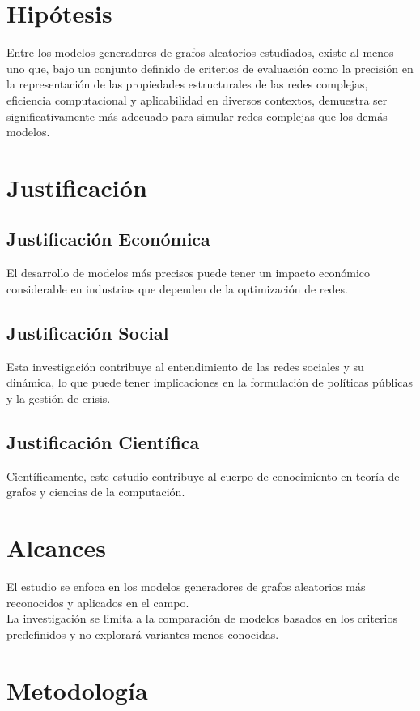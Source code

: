 \documentclass[12pt]{book}
\begin{document}
\section{Hipótesis}
Entre los modelos generadores de grafos aleatorios estudiados, existe al menos uno que, bajo un conjunto definido de criterios de evaluación como la precisión en la representación de las propiedades estructurales de las redes complejas, eficiencia computacional y aplicabilidad en diversos contextos, demuestra ser significativamente más adecuado para simular redes complejas que los demás modelos.

\section{Justificación}
\subsection{Justificación Económica}
El desarrollo de modelos más precisos puede tener un impacto económico considerable en industrias que dependen de la optimización de redes.
\subsection{Justificación Social}
Esta investigación contribuye al entendimiento de las redes sociales y su dinámica, lo que puede tener implicaciones en la formulación de políticas públicas y la gestión de crisis.
\subsection{Justificación Científica}
Científicamente, este estudio contribuye al cuerpo de conocimiento en teoría de grafos y ciencias de la computación.

\section{Alcances}
El estudio se enfoca en los modelos generadores de grafos aleatorios más reconocidos y aplicados en el campo.\\
La investigación se limita a la comparación de modelos basados en los criterios predefinidos y no explorará variantes menos conocidas.

\section{Metodología}
\end{document}
